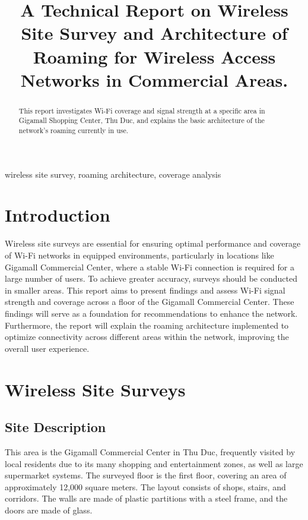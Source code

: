 \documentclass[conference]{IEEEtran}
\title{A Technical Report on Wireless Site Survey and Architecture of Roaming for Wireless Access Networks in Commercial Areas.}
\author{
    \IEEEauthorblockN{Nguyen Duc Chi Dat}
    \IEEEauthorblockA{
        \textit{Faculty of Information Security,} \\
        \textit{University of Information Technology}\\ 
        Ho Chi Minh City, Viet Nam \\
        datndc.19@grad.uit.edu.vn
    }
}
\begin{document}
\maketitle

\begin{abstract}
This report investigates Wi-Fi coverage and signal strength at a specific area in Gigamall Shopping Center, Thu Duc, and explains the basic architecture of the network's roaming currently in use.
\end{abstract}

\begin{IEEEkeywords}
wireless site survey, roaming architecture, coverage analysis
\end{IEEEkeywords}

\section{Introduction}
Wireless site surveys are essential for ensuring optimal performance and coverage of Wi-Fi networks in equipped environments, particularly in locations like Gigamall Commercial Center, where a stable Wi-Fi connection is required for a large number of users. To achieve greater accuracy, surveys should be conducted in smaller areas. This report aims to present findings and assess Wi-Fi signal strength and coverage across a floor of the Gigamall Commercial Center. These findings will serve as a foundation for recommendations to enhance the network. Furthermore, the report will explain the roaming architecture implemented to optimize connectivity across different areas within the network, improving the overall user experience.

\section{Wireless Site Surveys}

\subsection{Site Description}
This area is the Gigamall Commercial Center in Thu Duc, frequently visited by local residents due to its many shopping and entertainment zones, as well as large supermarket systems. The surveyed floor is the first floor, covering an area of approximately 12,000 square meters. The layout consists of shops, stairs, and corridors. The walls are made of plastic partitions with a steel frame, and the doors are made of glass.
\end{document}

